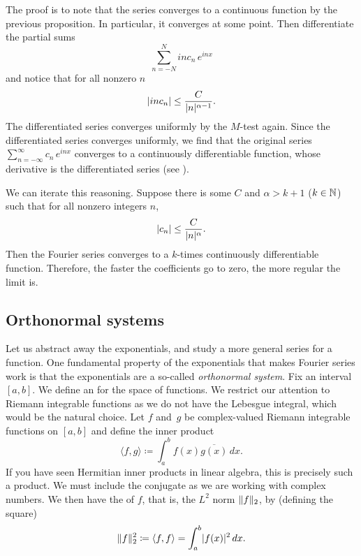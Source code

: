 The proof is to note that the series converges to a continuous
function by the previous proposition.
In particular, it converges at some point.
Then differentiate the partial sums
\begin{equation*}
\sum_{n=-N}^{N}
i n c_n \,e^{inx}
\end{equation*}
and notice that for all nonzero $n$
\begin{equation*}
\lvert {i n c_n} \rvert \leq \frac{C}{\lvert {n} \rvert^{\alpha-1}} .
\end{equation*}
The differentiated series converges uniformly by the $M$-test again.  Since
the differentiated series
converges uniformly, we find that the original series
$\sum_{n=-\infty}^\infty c_n\,e^{inx}$
converges 
to a continuously differentiable function, whose derivative is
the differentiated series (see ).

We can iterate this reasoning.
Suppose there is
some $C$ and $\alpha > k+1$ ($k \in {\mathbb{N}}$) such that
for all nonzero integers $n$,
\begin{equation*}
\lvert {c_n} \rvert 
\leq \frac{C}{\lvert {n} \rvert^\alpha} .
\end{equation*}
Then 
the Fourier series converges to a $k$-times continuously differentiable
function.  Therefore, the faster the coefficients go to zero, the more
regular the limit is.

\subsection{Orthonormal systems}

Let us abstract away the exponentials, and
study a more general series for a function.
One fundamental property of the exponentials that makes Fourier series work
is that the exponentials are a so-called \emph{orthonormal system}.
Fix an interval $[a,b]$.  We define an
\emph{} for the space of functions.  We restrict our attention
to Riemann integrable functions as we do not have the Lebesgue
integral, which
would be the natural choice.  Let $f$ and~$g$ be complex-valued 
Riemann integrable functions on $[a,b]$ and define the inner product
\begin{equation*}
\langle f , g \rangle \coloneqq
\int_a^b f(x) \overline{g(x)} \, dx .
\end{equation*}
If you have seen Hermitian inner products in linear algebra, this
is precisely such a product.  We must include the conjugate as we are
working with complex numbers.  We then have the  of $f$, that
is, the $L^2$ norm $\lVert {f} \rVert_2$, by (defining the square)
\begin{equation*}
\lVert {f} \rVert_2^2 \coloneqq
\langle f , f \rangle =
\int_a^b \lvert {f(x)} \rvert^2 \, dx .
\end{equation*}

